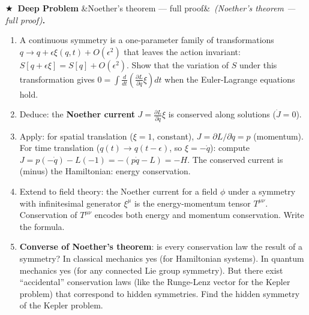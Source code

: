 \documentclass[12pt,a4paper]{article}
\newcounter{problem}
\newcounter{deepproblem}
\newenvironment{deepproblem}[1][]{\refstepcounter{deepproblem}\par\vspace{6pt}\noindent\textbf{\color{NavyBlue}$\bigstar$\ Deep Problem \thedeepproblem}\ifx&#1&\else\ \textit{(#1)}\fi\textbf{.}\enskip}{\par\vspace{4pt}}
\begin{document}
\begin{deepproblem}[Noether's theorem --- full proof]
\begin{enumerate}[label=(\alph*)]
  \item A continuous symmetry is a one-parameter family of transformations $q\to q+\epsilon\xi(q,t)+O(\epsilon^2)$ that leaves the action invariant: $S[q+\epsilon\xi]=S[q]+O(\epsilon^2)$. Show that the variation of $S$ under this transformation gives $0=\int\frac{d}{dt}\left(\frac{\partial L}{\partial\dot q}\xi\right)dt$ when the Euler-Lagrange equations hold.
  \item Deduce: the \textbf{Noether current} $J = \frac{\partial L}{\partial\dot q}\xi$ is conserved along solutions ($\dot J=0$).
  \item Apply: for spatial translation ($\xi=1$, constant), $J=\partial L/\partial\dot q = p$ (momentum). For time translation ($q(t)\to q(t-\epsilon)$, so $\xi=-\dot q$): compute $J=p(-\dot q)-L(-1)=-(p\dot q-L)=-H$. The conserved current is (minus) the Hamiltonian: energy conservation.
  \item Extend to field theory: the Noether current for a field $\phi$ under a symmetry with infinitesimal generator $\xi^\mu$ is the energy-momentum tensor $T^{\mu\nu}$. Conservation of $T^{\mu\nu}$ encodes both energy and momentum conservation. Write the formula.
  \item \textbf{Converse of Noether's theorem}: is every conservation law the result of a symmetry? In classical mechanics yes (for Hamiltonian systems). In quantum mechanics yes (for any connected Lie group symmetry). But there exist ``accidental'' conservation laws (like the Runge-Lenz vector for the Kepler problem) that correspond to hidden symmetries. Find the hidden symmetry of the Kepler problem.
\end{enumerate}
\end{deepproblem}
\end{document}
